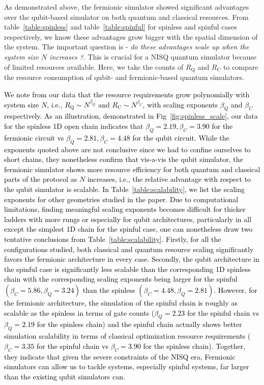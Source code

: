 \documentclass[aps, prx, reprint, superscriptaddress]{revtex4-2}
\begin{document}
As demonstrated above, the fermionic simulator showed significant advantages over the qubit-based simulator on both quantum and classical resources. From table~\ref{table:spinless} and table~\ref{table:spinful} for spinless and spinful cases respectively, we know these advantages grow bigger with the spatial dimension of the system. The important question is - \emph{do these advantages scale up when the system size $N$ increases ?}. This is crucial for a NISQ quantum simulator because of limited resources available. Here, we take the counts of $R_\text{Q}$ and $R_\text{C}$ to compare the resource consumption of qubit- and fermionic-based quantum simulators. 


\textcolor{black}{We note from our data that the resource requirements grow polynomially with system size $N$, i.e., $R_\text{Q} \sim N^{\beta_Q}$ and $R_\text{C} \sim N^{\beta_C}$, with scaling exponents $\beta_Q$ and $\beta_C$ respectively. As an illustration, demonstrated in Fig~\ref{fig:spinless_scale}, our data for the spinless 1D open chain indicates that $\beta_Q = 2.19, \beta_C = 3.90$ for the fermionic circuit vs $\beta_Q = 2.81, \beta_C = 4.48$ for the qubit circuit. While the exponents quoted above are not conclusive since we had to confine ourselves to short chains, they nonetheless confirm that vis-a-vis the qubit simulator, the fermionic simulator shows more resource efficiency for both quantum and classical parts of the protocol as $N$ increases, i.e., the relative advantage with respect to the qubit simulator is scalable. In Table~\ref{table:scalability}, we list the scaling exponents for other geometries studied in the paper. Due to computational limitations, finding meaningful scaling exponents becomes difficult for thicker ladders with more rungs or especially for qubit architectures,  particularly in all except the simplest 1D chain for the spinful case, one can nonetheless draw two tentative conclusions from Table~\ref{table:scalability}. Firstly, for all the configurations studied, both classical and quantum resource scaling significantly favors the fermionic architecture in every case. Secondly, the qubit architecture in the spinful case is significantly less scalable than the corresponding 1D spinless chain with the corresponding scaling exponents being larger for the spinful $(\beta_C =5.86, \beta_{Q} = 3.24)$ than the spinless $(\beta_C = 4.48, \beta_Q = 2.81)$. However, for the fermionic architecture, the simulation of the spinful chain is roughly as scalable as the spinless in terms of gate counts ($\beta_Q = 2.23$ for the spinful chain vs $\beta_Q = 2.19$ for the spinless chain) and the spinful chain actually shows better simulation scalability in terms of classical optimization resource requirements ($\beta_C = 3.35$ for the spinful chain vs $\beta_C = 3.90$ for the spinless chain). Together, they indicate that given the severe constraints of the NISQ era, Fermionic simulators can allow us to tackle systems, especially spinful systems, far larger than the existing qubit simulators can.}
\end{document}

